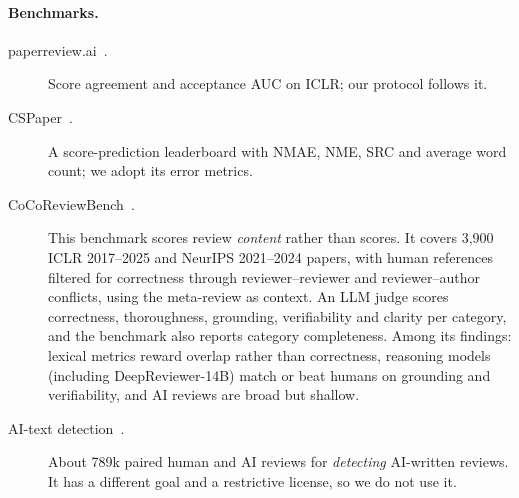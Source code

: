 \documentclass[11pt,a4paper]{article}
\begin{document}
\paragraph{Benchmarks.}
\begin{description}
\item[paperreview.ai~\citep{paperreview}.] Score agreement and acceptance AUC on ICLR; our
protocol follows it.
\item[CSPaper~\citep{cspaper}.] A score-prediction leaderboard with NMAE, NME, SRC and average
word count; we adopt its error metrics.
\item[CoCoReviewBench~\citep{deng2026cocoreviewbench}.] This benchmark scores review
\emph{content} rather than scores. It covers 3{,}900 ICLR 2017--2025 and NeurIPS 2021--2024 papers,
with human references filtered for correctness through reviewer--reviewer and reviewer--author
conflicts, using the meta-review as context. An LLM judge scores correctness, thoroughness,
grounding, verifiability and clarity per category, and the benchmark also reports category
completeness. Among its findings: lexical metrics reward overlap rather than correctness, reasoning
models (including DeepReviewer-14B) match or beat humans on grounding and verifiability, and AI
reviews are broad but shallow.
\item[AI-text detection~\citep{yu2025detect}.] About 789k paired human and AI reviews for
\emph{detecting} AI-written reviews. It has a different goal and a restrictive license, so we do
not use it.
\end{description}
\end{document}
